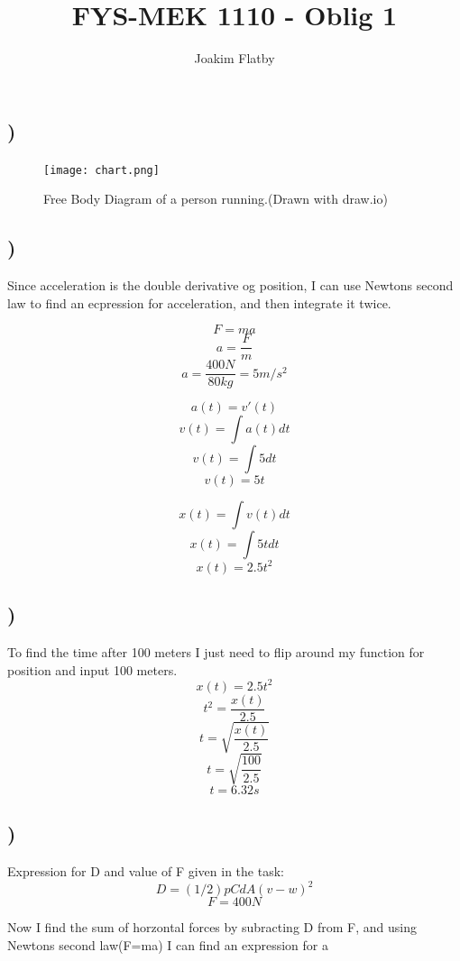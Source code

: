 \documentclass[a4paper,10pt,norsk]{article}
\title{FYS-MEK 1110 - Oblig 1}
\author{Joakim Flatby}
\begin{document}
\maketitle
\section{}


\subsection{)}

\begin{figure}[h!]
        \centering 
        \texttt{[image: chart.png]} 
        \caption{Free Body Diagram of a person running.(Drawn with draw.io)}
\end{figure}

\subsection{)}
 
 Since acceleration is the double derivative og position, I can use Newtons second law to find an ecpression for acceleration, and then integrate it twice.
 
 \[F = ma\]
 \[a = \frac{F}{m}\]
 \[a = \frac{400N}{80kg} = 5m/s^{2}\]
 
 \[a(t) = v'(t)\]
 \[v(t) = \int a(t)  dt\]
 \[v(t) = \int 5dt\]
 \[v(t) = 5t\]
 
 \[x(t) = \int v(t) dt\]
\[x(t) = \int 5t dt\]
\[x(t) = 2.5t^{2}\] 
 
 \subsection{)}
 To find the time after 100 meters I just need to flip around my function for position and input 100 meters.
 \[x(t) = 2.5t^{2}\]
 \[t^{2} = \frac{x(t)}{2.5}\]
 \[t = \sqrt{\frac{x(t)}{2.5}}\]
 \[t = \sqrt{\frac{100}{2.5}}\]
 \[t = 6.32s\]
 
 \subsection{)}
 
 Expression for D and value of F given in the task:
 \[D = (1/2)pCdA(v-w)^{2}\]
 \[F = 400N\]
 
 Now I find the sum of horzontal forces by subracting D from F, and using Newtons second law(F=ma) I can find an expression for a
 
\end{document}
